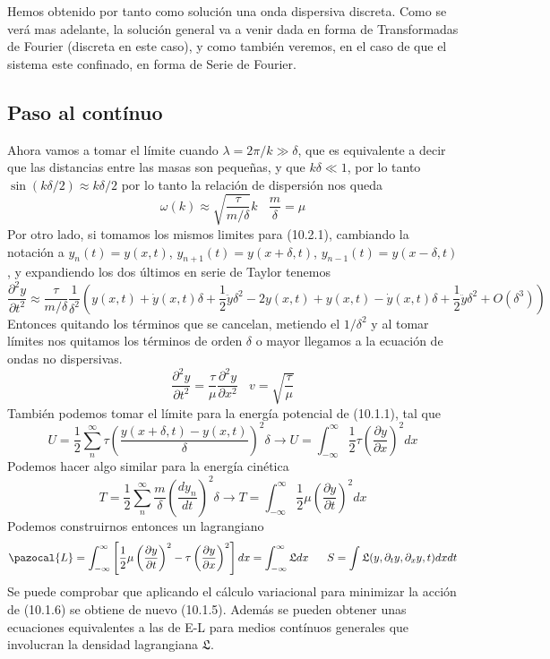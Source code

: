 Hemos obtenido por tanto como solución una onda dispersiva discreta. Como se verá mas adelante, la solución general va a venir dada en forma de Transformadas de Fourier (discreta en este caso), y como también veremos, en el caso de que el sistema este confinado, en forma de Serie de Fourier.

\newpage
\subsection{Paso al contínuo}
Ahora vamos a tomar el límite cuando $\lambda = 2\pi / k \gg \delta$, que es equivalente a decir que las distancias entre las masas son pequeñas, y que $k\delta \ll 1$, por lo tanto $\sin{\left(k \delta/2\right)} \approx k \delta/2$ por lo tanto la relación de dispersión nos queda 
\begin{equation} \label{6.1.1}
    \omega (k) \approx  \sqrt{\frac{\tau}{m/\delta}} k \ \ \ \ \frac{m}{\delta} = \mu
\end{equation}
Por otro lado, si tomamos los mismos limites para (10.2.1), cambiando la notación a $y_{n} (t) = y(x,t)$, $y_{n+1}(t) = y(x+\delta,t)$, $y_{n-1}(t) = y(x-\delta,t)$, y expandiendo los dos últimos en serie de Taylor tenemos
\[\frac{\partial^2 y}{\partial t^2} \approx \frac{\tau}{m/\delta} \frac{1}{\delta^2}\left(y(x,t)+\dot{y}(x,t)\delta + \frac{1}{2}\ddot{y} \delta^2-2y(x,t)+y(x,t)-\dot{y}(x,t)\delta + \frac{1}{2}\ddot{y} \delta^2+ O(\delta^3)\right)\]
Entonces quitando los términos que se cancelan, metiendo el $1/\delta^2$ y al tomar límites nos quitamos los términos de orden $\delta$ o mayor llegamos a la ecuación de ondas no dispersivas.
\begin{equation} \label{6.1.1}
    \frac{\partial^2 y}{\partial t^2} = \frac{\tau}{\mu} \frac{\partial^2 y}{\partial x^2} \ \ \ \ v = \sqrt{\frac{\tau}{\mu}}
\end{equation}
También podemos tomar el límite para la energía potencial de (10.1.1), tal que
\[ U = \frac{1}{2} \sum_n^\infty \tau \left(\frac{y(x+\delta,t)-y(x,t)}{\delta}\right)^2 \delta \rightarrow U = \int_{-\infty}^\infty \frac{1}{2} \tau \left(\frac{\partial y}{\partial x}\right)^2 dx\]
Podemos hacer algo similar para la energía cinética
\[ T = \frac{1}{2} \sum_n^\infty \frac{m}{\delta} \left(\frac{d y_n}{dt}\right)^2 \delta \rightarrow T = \int_{-\infty}^\infty \frac{1}{2} \mu \left(\frac{\partial y}{\partial t}\right)^2 dx\]
Podemos construirnos entonces un lagrangiano
\begin{equation} \label{6.1.1}
    \pazocal{L} = \int_{-\infty}^\infty \left[\frac{1}{2} \mu \left(\frac{\partial y}{\partial t}\right)^2 - \tau \left(\frac{\partial y}{\partial x}\right)^2\right] dx= \int_{-\infty}^\infty \mathfrak{L}dx \ \ \ \ \ S = \int \mathfrak{L}(y,\partial_t y,\partial_x y,t) dxdt
\end{equation}
Se puede comprobar que aplicando el cálculo variacional para minimizar la acción de (10.1.6) se obtiene de nuevo (10.1.5). Además se pueden obtener unas ecuaciones equivalentes a las de E-L para medios contínuos generales que involucran la densidad lagrangiana $\mathfrak{L}$.

